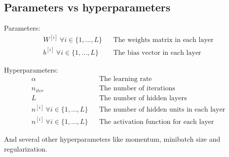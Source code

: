 \subsection*{Parameters vs hyperparameters}

Parameters:
\begin{align*}
    W^{[i]} \ \forall i \in \{1,...,L\} && \text{The weights matrix in each layer} \\
    b^{[i]} \ \forall i \in \{1,...,L\} && \text{The bias vector in each layer} 
\end{align*}

Hyperparameters:
\begin{align*}
    \alpha && \text{The learning rate} \\
    n_{iter} && \text{The number of iterations} \\
    L && \text{The number of hidden layers} \\
    n^{[i]} \ \forall i \in \{1,...,L\} && \text{The number of hidden units in each layer} \\
    n^{[i]} \ \forall i \in \{1,...,L\} && \text{The activation function for each layer}
\end{align*}

And several other hyperparameters like momentum, minibatch size and regularization.


